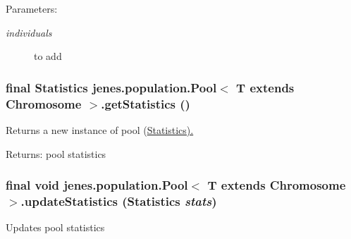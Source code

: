 \begin{Desc}
\item[Parameters:]
\begin{description}
\item[{\em individuals}]to add \end{description}
\end{Desc}
\hypertarget{classjenes_1_1population_1_1_pool_3_01_t_01extends_01_chromosome_01_4_4dad9ede915eee82d23a76a95af866ed}{
\subsubsection[getStatistics]{\setlength{\rightskip}{0pt plus 5cm}final Statistics jenes.population.Pool$<$ T extends Chromosome $>$.getStatistics ()}}
\label{classjenes_1_1population_1_1_pool_3_01_t_01extends_01_chromosome_01_4_4dad9ede915eee82d23a76a95af866ed}


Returns a new instance of pool (\hyperlink{}{Statistics).} \begin{Desc}
\item[Returns:]pool statistics \end{Desc}
\hypertarget{classjenes_1_1population_1_1_pool_3_01_t_01extends_01_chromosome_01_4_5e0915555c9dd5baa482bab3acc830fd}{
\subsubsection[updateStatistics]{\setlength{\rightskip}{0pt plus 5cm}final void jenes.population.Pool$<$ T extends Chromosome $>$.updateStatistics (Statistics {\em stats})}}
\label{classjenes_1_1population_1_1_pool_3_01_t_01extends_01_chromosome_01_4_5e0915555c9dd5baa482bab3acc830fd}


Updates pool statistics 

